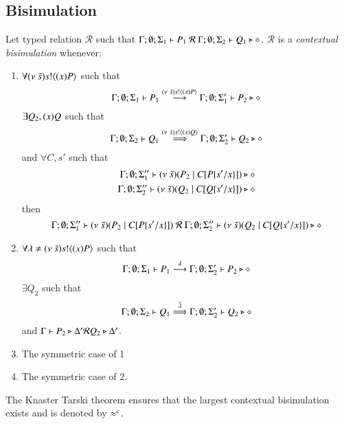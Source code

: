 \subsection{Bisimulation}

\begin{definition}\rm
	Let typed relation $\mathcal{R}$ such that $\Gamma; \emptyset; \Sigma_1 \vdash P_1\ \mathcal{R}\ \Gamma; \emptyset; \Sigma_2 \vdash Q_1 \triangleright \diamond$.
	$\mathcal{R}$ is a {\em contextual bisimulation} whenever:
	\begin{enumerate}
		\item	$\forall (\nu\ \tilde{s}) s ! \langle (x)P \rangle$ such that
			\[
				\Gamma; \emptyset; \Sigma_1 \vdash P_1 \stackrel{(\nu\ \tilde{s}) s ! \langle (x)P \rangle}{\longrightarrow} \Gamma; \emptyset; \Sigma_1' \vdash P_2 \triangleright \diamond
			\]
			$\exists Q_2, (x)Q$ such that
			\[
				\Gamma; \emptyset; \Sigma_2 \vdash Q_1 \stackrel{(\nu\ \tilde{s}) s ! \langle (x)Q \rangle}{\Longrightarrow} \Gamma; \emptyset; \Sigma_2' \vdash Q_2 \triangleright \diamond
			\]
			and $\forall C, s'$ such that
			\begin{eqnarray*}
				\Gamma; \emptyset; \Sigma_1'' \vdash (\nu\ \tilde{s})(P_2 \;|\; C[P \{s'/x \}]) \triangleright \diamond \\
				\Gamma; \emptyset; \Sigma_2'' \vdash (\nu\ \tilde{s})(Q_2 \;|\; C[Q \{s'/x \}]) \triangleright \diamond
			\end{eqnarray*}
			then
			\[
				\Gamma; \emptyset; \Sigma_1'' \proves \newsp{\tilde{s}}{P_2 \Par \context{C}{P \subst{s'}{x}}}\ \mathcal{R}\ 
				\Gamma; \emptyset; \Sigma_2'' \proves \newsp{\tilde{s}}{Q_2 \Par \context{C}{Q \subst{s'}{x}}} \hastype \Proc
			\]

		\item	$\forall \lambda \not= (\nu\ \tilde{s}) s ! \langle (x)P \rangle$ such that
			\[
				\Gamma; \emptyset; \Sigma_1 \vdash P_1 \stackrel{\lambda}{\longrightarrow} \Gamma; \emptyset; \Sigma_2' \vdash P_2 \triangleright \diamond
			\]
			$\exists Q_2$ such that 
			\[
				\Gamma; \emptyset; \Sigma_2 \vdash Q_1 \stackrel{\hat{\lambda}}{\Longrightarrow} \Gamma; \emptyset; \Sigma_2' \vdash Q_2 \triangleright \diamond
			\]
			and
			$\Gamma \vdash P_2 \triangleright \Delta' \mathcal{R} Q_2 \triangleright \Delta'$.

		\item	The symmetric case of 1 
		\item	The symmetric case of 2.
	\end{enumerate}
	The Knaster Tarski theorem ensures that the largest contextual bisimulation exists and is denoted by $\approx^c$.
\end{definition}


